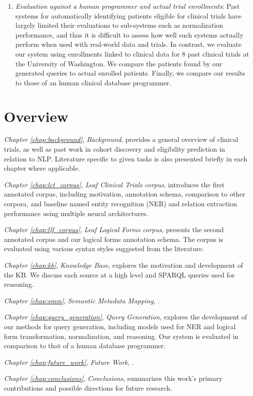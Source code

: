\documentclass[../main.tex]{subfiles}
\begin{document}
\begin{enumerate}
    \item \textit{Evaluation against a human programmer and actual trial enrollments}: Past systems for automatically identifying patients eligible for clinical trials have largely limited their evaluations to sub-systems such as normalization performance, and thus it is difficult to assess how well such systems actually perform when used with real-world data and trials. In contrast, we evaluate our system using enrollments linked to clinical data for 8 past clinical trials at the University of Washington. We compare the patients found by our generated queries to actual enrolled patients. Finally, we compare our results to those of an human clinical database programmer.
\end{enumerate}

\section{Overview}

\textit{Chapter \ref{chap:background}}, \textit{Background}, provides a general overview of clinical trials, as well as past work in cohort discovery and eligibility prediction in relation to NLP. Literature specific to given tasks is also presented briefly in each chapter where applicable. 

\textit{Chapter \ref{chap:lct_corpus}}, \textit{Leaf Clinical Trials corpus}, introduces the first annotated corpus, including motivation, annotation schema, comparison to other corpora, and baseline named entity recognition (NER) and relation extraction performance using multiple neural architectures.

\textit{Chapter \ref{chap:llf_corpus}}, \textit{Leaf Logical Forms corpus}, presents the second annotated corpus and our logical forms annotation schema. The corpus is evaluated using various syntax styles suggested from the literature.

\textit{Chapter \ref{chap:kb}}, \textit{Knowledge Base}, explores the motivation and development of the KB. We discuss each source at a high level and SPARQL queries used for reasoning.

\textit{Chapter \ref{chap:smm}}, \textit{Semantic Metadata Mapping}, .

\textit{Chapter \ref{chap:query_generation}}, \textit{Query Generation}, explores the development of our methods for query generation, including models used for NER and logical form transformation, normalization, and reasoning. Our system is evaluated in comparison to that of a human database programmer.

\textit{Chapter \ref{chap:future_work}}, \textit{Future Work}, .

\textit{Chapter \ref{chap:conclusions}}, \textit{Conclusions}, summarizes this work's primary contributions and possible directions for future research.
\end{document}

